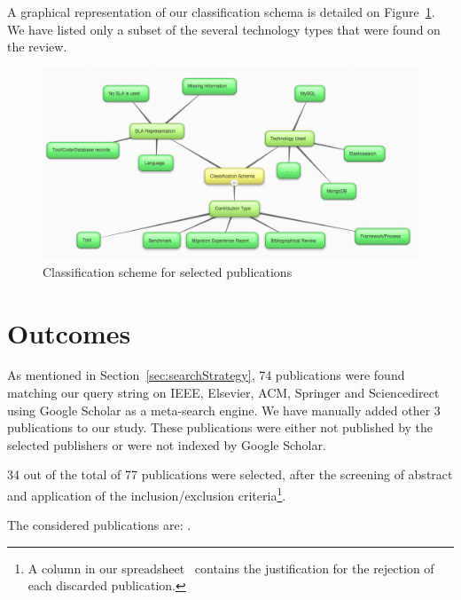 \documentclass{article}
\begin{document}
A graphical representation of our classification schema is detailed on Figure~\ref{fig:classificationSchema}. We have listed only a subset of the several technology types that were found on the review.

\begin{figure}[!h]
\centering
\includegraphics[width=130mm]{classificationSchema.png}
\caption{Classification scheme for selected publications \label{fig:classificationSchema}}
\end{figure}



\section{Outcomes}
\label{sec:outcomes}

As mentioned in Section~\ref{sec:searchStrategy}, 74 publications were found matching our query string on IEEE, Elsevier, ACM, Springer and Sciencedirect using Google Scholar as a meta-search engine. We have manually added other 3 publications to our study. These publications were either not published by the selected publishers or were not indexed by Google Scholar. 

34 out of the total of 77 publications were selected, after the screening of abstract and application of the inclusion/exclusion criteria\footnote{A column in our spreadsheet~\cite{systematicMappingSpreadsheet} contains the justification for the rejection of each discarded publication.}.

The considered publications are: \cite{6665220} \cite{6253526}  \cite{6461875} \cite{6597164} \cite{6616442} \cite{Xiong:2012:DMR:2213598.2213614} \cite{Alomari:2014:CFD:2684200.2684324} \cite{6632740} \cite{6253597} \cite{cloudhosteddatabases} \cite{6655733} \cite{192837618237651293} \cite{6616442} \cite{designinganddevelopment} \cite{5959767} \cite{Petcu20131417} \cite{Giannikis:2013:WOU:2463676.2463678} \cite{1236781237} \cite{6280329} \cite{6681233} \cite{Xiong:2011:APA:2038916.2038931} \cite{7037676} \cite{7017947} \cite{Qiao:2013:BFE:2463676.2465298} \cite{5742778} \cite{Montes20132026} \cite{Elmore:2013:CTB:2463676.2465308} \cite{12789361729836} \cite{6842585} \cite{Shue:2014:ARV:2592798.2592823} \cite{Schram:2012:MND:2384716.2384773} \cite{buazuartransition} \cite{gomez2014building} \cite{6546068}.
\end{document}
